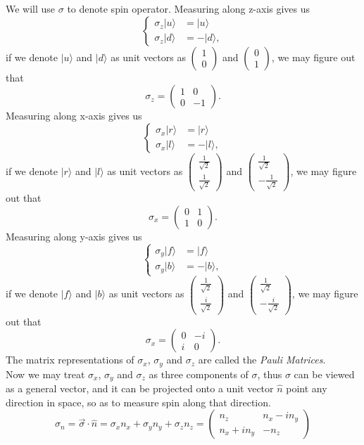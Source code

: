 \documentclass{article}
\newcommand{\be}{\begin{equation}}
\newcommand{\ee}{\end{equation}}
\newcommand{\ba}{\begin{array}}
\newcommand{\ea}{\end{array}}
\newcommand{\1}{\left}
\newcommand{\2}{\right}
\newcommand{\ke}{\rangle}
\newcommand{\n}{\nu}
\newcommand{\sig}{\sigma}
\begin{document}
We will use $\sig$ to denote spin operator. Measuring along z-axis gives us
\be\1\{\begin{split}
\sig_z |u\ke&=|u\ke\\
\sig_z |d\ke&=-|d\ke,
\end{split}\2.\ee
if we denote $|u\ke$ and $|d\ke$ as unit vectors as $\1(\ba{c}1\\0\ea\2)$ and $\1(\ba{c}0\\1\ea\2)$, we may figure out that
\be
\sig_z=\1(\ba{cc}1&0\\0&-1\ea\2).
\ee
Measuring along x-axis gives us
\be\1\{\begin{split}
\sig_x |r\ke&=|r\ke\\
\sig_x |l\ke&=-|l\ke,
\end{split}\2.\ee
if we denote $|r\ke$ and $|l\ke$ as unit vectors as $\1(\ba{c}\frac1{\sqrt{2}}\\\frac1{\sqrt{2}}\ea\2)$ and $\1(\ba{c}\frac1{\sqrt{2}}\\-\frac1{\sqrt{2}}\ea\2)$, we may figure out that
\be
\sig_x=\1(\ba{cc}0&1\\1&0\ea\2).
\ee
Measuring along y-axis gives us
\be\1\{\begin{split}
\sig_y |f\ke&=|f\ke\\
\sig_y |b\ke&=-|b\ke,
\end{split}\2.\ee
if we denote $|f\ke$ and $|b\ke$ as unit vectors as $\1(\ba{c}\frac1{\sqrt{2}}\\\frac i{\sqrt{2}}\ea\2)$ and $\1(\ba{c}\frac1{\sqrt{2}}\\-\frac i{\sqrt{2}}\ea\2)$, we may figure out that
\be
\sig_x=\1(\ba{cc}0&-i\\i&0\ea\2).
\ee
The matrix representations of $\sig_x$, $\sig_y$ and $\sig_z$ are called the \textit{Pauli Matrices}.\\

Now we may treat $\sig_x$, $\sig_y$ and $\sig_z$ as three components of $\sig$, thus $\sig$ can be viewed as a general vector, and it can be projected onto a unit vector $\hat n$ point any direction in space, so as to measure spin along that direction.
\be
\sig_n=\vec\sig\cdot\hat n=\sig_xn_x+\sig_yn_y+\sig_zn_z=\1(\ba{cc}n_z&n_x-in_y\\n_x+in_y&-n_z\ea\2)
\ee
\end{document}
